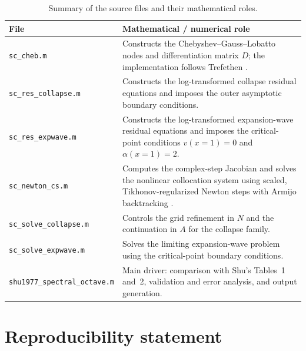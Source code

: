 \documentclass[11pt,a4paper]{article}
\begin{document}
\begin{table}[H]
\centering
\renewcommand{\arraystretch}{1.35}
\begin{tabular}{@{}p{5.0cm}p{9.0cm}@{}}
\toprule
\textbf{File} & \textbf{Mathematical / numerical role} \\
\midrule

\texttt{sc\_cheb.m}
&
Constructs the Chebyshev--Gauss--Lobatto nodes and differentiation
matrix $D$; the implementation follows Trefethen
\cite[Program~6]{trefethen2000}.
\\

\texttt{sc\_res\_collapse.m}
&
Constructs the log-transformed collapse residual equations and imposes
the outer asymptotic boundary conditions.
\\

\texttt{sc\_res\_expwave.m}
&
Constructs the log-transformed expansion-wave residual equations and
imposes the critical-point conditions $v(x{=}1)=0$ and
$\alpha(x{=}1)=2$.
\\

\texttt{sc\_newton\_cs.m}
&
Computes the complex-step Jacobian \cite{squire1998} and
solves the nonlinear collocation system using scaled,
Tikhonov-regularized Newton steps \cite{tikhonov1963} with
Armijo backtracking \cite{armijo1966}.
\\

\texttt{sc\_solve\_collapse.m}
&
Controls the grid refinement in $N$ and the continuation in $A$ for the
collapse family.
\\

\texttt{sc\_solve\_expwave.m}
&
Solves the limiting expansion-wave problem using the critical-point
boundary conditions.
\\

\texttt{shu1977\_spectral\_octave.m}
&
Main driver: comparison with Shu's Tables~1 and~2, validation and error
analysis, and output generation.
\\

\bottomrule
\end{tabular}
\caption{Summary of the source files and their mathematical roles.}
\label{tab:files}
\end{table}

\section{Reproducibility statement}
\label{sec:repro}
\end{document}
